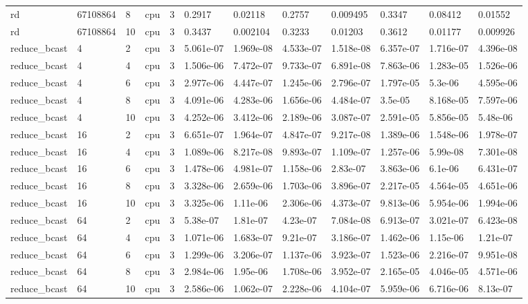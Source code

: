 \begin{tabular}{llllllllllll}
rd & 67108864 & 8 & cpu & 3 & 0.2917 & 0.02118 & 0.2757 & 0.009495 & 0.3347 & 0.08412 & 0.01552 \\
rd & 67108864 & 10 & cpu & 3 & 0.3437 & 0.002104 & 0.3233 & 0.01203 & 0.3612 & 0.01177 & 0.009926 \\
reduce\_bcast & 4 & 2 & cpu & 3 & 5.061e-07 & 1.969e-08 & 4.533e-07 & 1.518e-08 & 6.357e-07 & 1.716e-07 & 4.396e-08 \\
reduce\_bcast & 4 & 4 & cpu & 3 & 1.506e-06 & 7.472e-07 & 9.733e-07 & 6.891e-08 & 7.863e-06 & 1.283e-05 & 1.526e-06 \\
reduce\_bcast & 4 & 6 & cpu & 3 & 2.977e-06 & 4.447e-07 & 1.245e-06 & 2.796e-07 & 1.797e-05 & 5.3e-06 & 4.595e-06 \\
reduce\_bcast & 4 & 8 & cpu & 3 & 4.091e-06 & 4.283e-06 & 1.656e-06 & 4.484e-07 & 3.5e-05 & 8.168e-05 & 7.597e-06 \\
reduce\_bcast & 4 & 10 & cpu & 3 & 4.252e-06 & 3.412e-06 & 2.189e-06 & 3.087e-07 & 2.591e-05 & 5.856e-05 & 5.48e-06 \\
reduce\_bcast & 16 & 2 & cpu & 3 & 6.651e-07 & 1.964e-07 & 4.847e-07 & 9.217e-08 & 1.389e-06 & 1.548e-06 & 1.978e-07 \\
reduce\_bcast & 16 & 4 & cpu & 3 & 1.089e-06 & 8.217e-08 & 9.893e-07 & 1.109e-07 & 1.257e-06 & 5.99e-08 & 7.301e-08 \\
reduce\_bcast & 16 & 6 & cpu & 3 & 1.478e-06 & 4.981e-07 & 1.158e-06 & 2.83e-07 & 3.863e-06 & 6.1e-06 & 6.431e-07 \\
reduce\_bcast & 16 & 8 & cpu & 3 & 3.328e-06 & 2.659e-06 & 1.703e-06 & 3.896e-07 & 2.217e-05 & 4.564e-05 & 4.651e-06 \\
reduce\_bcast & 16 & 10 & cpu & 3 & 3.325e-06 & 1.11e-06 & 2.306e-06 & 4.373e-07 & 9.813e-06 & 5.954e-06 & 1.994e-06 \\
reduce\_bcast & 64 & 2 & cpu & 3 & 5.38e-07 & 1.81e-07 & 4.23e-07 & 7.084e-08 & 6.913e-07 & 3.021e-07 & 6.423e-08 \\
reduce\_bcast & 64 & 4 & cpu & 3 & 1.071e-06 & 1.683e-07 & 9.21e-07 & 3.186e-07 & 1.462e-06 & 1.15e-06 & 1.21e-07 \\
reduce\_bcast & 64 & 6 & cpu & 3 & 1.299e-06 & 3.206e-07 & 1.137e-06 & 3.923e-07 & 1.523e-06 & 2.216e-07 & 9.951e-08 \\
reduce\_bcast & 64 & 8 & cpu & 3 & 2.984e-06 & 1.95e-06 & 1.708e-06 & 3.952e-07 & 2.165e-05 & 4.046e-05 & 4.571e-06 \\
reduce\_bcast & 64 & 10 & cpu & 3 & 2.586e-06 & 1.062e-07 & 2.228e-06 & 4.104e-07 & 5.959e-06 & 6.716e-06 & 8.13e-07 \\

\end{tabular}

